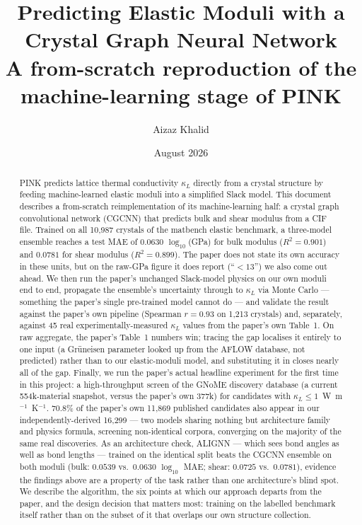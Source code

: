 \documentclass[11pt,a4paper]{article}
\title{\vspace{-1.5cm}\textbf{Predicting Elastic Moduli with a Crystal Graph
Neural Network}\\[4pt]
\large A from-scratch reproduction of the machine-learning stage of PINK}
\author{Aizaz Khalid}
\date{August 2026}
\begin{document}
\maketitle
\vspace{-0.8cm}

\begin{abstract}
\noindent
PINK predicts lattice thermal conductivity $\kappa_L$ directly from a crystal
structure by feeding machine-learned elastic moduli into a simplified Slack
model. This document describes a from-scratch reimplementation of its
machine-learning half: a crystal graph convolutional network (CGCNN) that
predicts bulk and shear modulus from a CIF file. Trained on all 10{,}987
crystals of the matbench elastic benchmark, a three-model ensemble reaches a
test MAE of $0.0630$ $\log_{10}$(GPa) for bulk modulus
($R^2 = 0.901$) and $0.0781$ for shear modulus ($R^2 = 0.899$). The paper does
not state its own accuracy in these units, but on the raw-GPa figure it does
report (``$<13$'') we also come out ahead. We then run the paper's unchanged
Slack-model physics on our own moduli end to end, propagate the ensemble's
uncertainty through to $\kappa_L$ via Monte Carlo --- something the paper's
single pre-trained model cannot do --- and validate the result against the
paper's own pipeline (Spearman $r = 0.93$ on 1{,}213 crystals) and, separately,
against 45 real experimentally-measured $\kappa_L$ values from the paper's own
Table~1. On raw aggregate, the paper's Table~1 numbers win; tracing the gap
localises it entirely to one input (a Gr\"uneisen parameter looked up from the
AFLOW database, not predicted) rather than to our elastic-moduli model, and
substituting it in closes nearly all of the gap. Finally, we run the paper's
actual headline experiment for the first time in this project: a
high-throughput screen of the GNoME discovery database (a current 554k-material
snapshot, versus the paper's own 377k) for candidates with
$\kappa_L \leq 1$~W~m$^{-1}$~K$^{-1}$. 70.8\% of the paper's own 11,869
published candidates also appear in our independently-derived 16,299 --- two
models sharing nothing but architecture family and physics formula,
screening non-identical corpora, converging on the majority of the same real
discoveries. As an architecture check, ALIGNN --- which sees bond angles as
well as bond lengths --- trained on the identical split beats the CGCNN
ensemble on both moduli (bulk: $0.0539$ vs.\ $0.0630$ $\log_{10}$ MAE; shear:
$0.0725$ vs.\ $0.0781$), evidence the findings above are a property of the
task rather than one architecture's blind spot. We describe the algorithm, the six points at which our approach
departs from the paper, and the design decision that matters most: training
on the labelled benchmark itself rather than on the subset of it that
overlaps our own structure collection.
\end{abstract}
\end{document}
